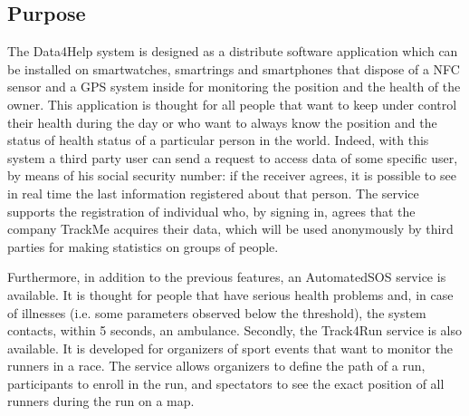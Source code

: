 \subsection{Purpose}
\par
The Data4Help system is designed as a distribute software application which can be installed on smartwatches, smartrings and smartphones that dispose of a NFC sensor and a GPS system inside for monitoring the position and the health of the owner. This application is thought for all people that want to keep under control their health during the day or who want to always know the position and the status of health status of a particular person in the world. Indeed, with this system a third party user can send a request to access data of some specific user, by means of his social security number: if the receiver agrees, it is possible to see in real time the last information registered about that person. The service supports the registration of individual who, by signing in, agrees that the company TrackMe acquires their data, which will be used anonymously by third parties for making statistics on groups of people.
\par 
Furthermore, in addition to the previous features, an AutomatedSOS service is available. It is thought for people that have serious health problems and, in case of illnesses (i.e. some parameters observed below the threshold), the system contacts, within 5 seconds, an ambulance. Secondly, the Track4Run service is also available. It is developed for organizers of sport events that want to monitor the runners in a race. The service allows organizers to define the path of a run, participants to enroll in the run, and spectators to see the exact position of all runners during the run on a map. \\

